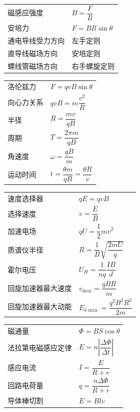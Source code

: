 \begin{tabularx}{\columnwidth}{XX}
  磁感应强度 & $B=\dfrac{F}{Il}$ \\
  安培力 & $F=BIl\sin\theta$ \\
  通电导线受力方向 & 左手定则 \\
  直导线磁场方向 & 安培定则 \\
  螺线管磁场方向 & 右手螺旋定则 \\
\end{tabularx}
\medskip

\begin{tabularx}{\columnwidth}{XX}
  洛伦兹力 & $F=qvB\sin\theta$ \\
  向心力关系 & $qvB=m\dfrac{v^2}{R}$ \\
  半径 & $R=\dfrac{mv}{qB}$ \\
  周期 & $T=\dfrac{2\pi m}{qB}$ \\
  角速度 & $\omega=\dfrac{qB}{m}$ \\
  运动时间 & $t=\dfrac{\theta m}{qB}=\dfrac{\theta R}{v}$ \\
\end{tabularx}
\medskip

\begin{tabularx}{\columnwidth}{XX}
  速度选择器 & $qE=qvB$ \\
  选择速度 & $v=\dfrac{E}{B}$ \\
  加速电场 & $qU=\dfrac12mv^2$ \\
  质谱仪半径 & $R=\dfrac1B\sqrt{\dfrac{2mU}{q}}$ \\
  霍尔电压 & $U_H=\dfrac1{nq}\dfrac{IB}{d}$ \\
  回旋加速器最大速度 & $v_{\max}=\dfrac{qBR}{m}$ \\
  回旋加速器最大动能 & $E_{k\max}=\dfrac{q^2B^2R^2}{2m}$ \\
\end{tabularx}
\medskip

\begin{tabularx}{\columnwidth}{XX}
  磁通量 & $\Phi=BS\cos\theta$ \\
  法拉第电磁感应定律 & $E=n\left|\dfrac{\Delta\Phi}{\Delta t}\right|$ \\
  感应电流 & $I=\dfrac{E}{R+r}$ \\
  回路电荷量 & $q=\dfrac{n\Delta\Phi}{R+r}$ \\
  导体棒切割 & $E=Blv$ \\
\end{tabularx}
\medskip

